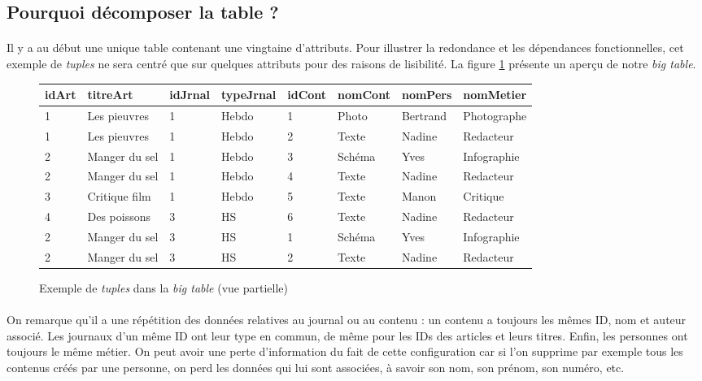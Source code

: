 \subsection{Pourquoi décomposer la table ?}
\paragraph{}{Il y a au début une unique table contenant une vingtaine d'attributs. Pour illustrer la redondance et les dépendances fonctionnelles, cet exemple de \textit{tuples} ne sera centré que sur quelques attributs pour des raisons de lisibilité. La figure \ref{bigtableex} présente un aperçu de notre \textit{big table}.}

\begin{figure}
\label{bigtableex}
    {
	\centering
    \begin{tabular}{|l|l|l|l|l|l|l|l|}
        \hline idArt & titreArt & idJrnal & typeJrnal & idCont & nomCont & nomPers & nomMetier \\ 
        \hline 1 & Les pieuvres & 1 & Hebdo & 1 & Photo & Bertrand & Photographe \\ 
        \hline 1 & Les pieuvres & 1 & Hebdo & 2 &Texte & Nadine & Redacteur \\ 
        \hline 2 & Manger du sel & 1 & Hebdo & 3 & Schéma & Yves & Infographie \\ 
        \hline 2 & Manger du sel & 1 & Hebdo & 4 & Texte & Nadine & Redacteur \\ 
        \hline 3 & Critique film & 1 & Hebdo & 5 & Texte & Manon & Critique \\ 
        \hline 4 & Des poissons & 3 & HS & 6 & Texte & Nadine & Redacteur \\ 
        \hline 2 & Manger du sel & 3 & HS & 1 & Schéma & Yves & Infographie \\ 
        \hline 2 & Manger du sel & 3 & HS & 2 & Texte & Nadine & Redacteur \\ 
        \hline 
    \end{tabular}
    }
\caption{Exemple de \textit{tuples} dans la \textit{big table} (vue partielle)}
\end{figure} 

\paragraph{}{On remarque qu'il a une répétition des données relatives au journal ou au contenu : un contenu a toujours les mêmes ID, nom et auteur associé. Les journaux d'un même ID ont leur type en commun, de même pour les IDs des articles et leurs titres. Enfin, les personnes ont toujours le même métier. On peut avoir une perte d'information du fait de cette configuration car si l'on supprime par exemple tous les contenus créés par une personne, on perd les données qui lui sont associées, à savoir son nom, son prénom, son numéro, etc.}

